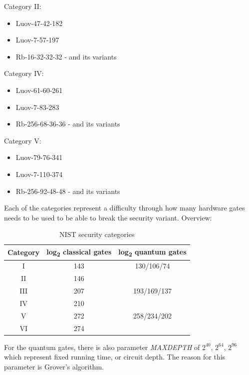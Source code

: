 \documentclass[thesis=M,english]{FITthesis}[2019/12/23]
\begin{document}
\bigskip
\noindent
Category II:
\begin{itemize}
\item Luov-47-42-182
\item Luov-7-57-197
\item Rb-16-32-32-32 - and its variants
\end{itemize}

\noindent
Category IV:
\begin{itemize}
\item Luov-61-60-261
\item Luov-7-83-283
\item Rb-256-68-36-36 - and its variants
\end{itemize}

\noindent
Category V:
\begin{itemize}
\item Luov-79-76-341
\item Luov-7-110-374
\item Rb-256-92-48-48 - and its variants
\end{itemize}

\noindent
Each of the categories represent a difficulty through how many hardware gates needs to be used to be able to break the security variant.\cite{L-NIST-STANDARD} Overview:
\begin{table}[H]
\centering
\begin{tabular}{|c|c|c|}
\hline
Category & log\textsubscript{2} classical gates & log\textsubscript{2} quantum gates \\ \hline
I         & 143                    & 130/106/74           \\ \hline
II        & 146                    &                      \\ \hline
III       & 207                    & 193/169/137          \\ \hline
IV        & 210                    &                      \\ \hline
V         & 272                    & 258/234/202          \\ \hline
VI        & 274                    &                      \\ \hline
\end{tabular}
\caption{NIST security categories}
\end{table}

\noindent
For the quantum gates, there is also parameter \textit{MAXDEPTH} of $2^{40}$, $2^{64}$, $2^{96}$ which represent fixed running time, or circuit depth. The reason for this parameter is Grover’s algorithm.
\end{document}
